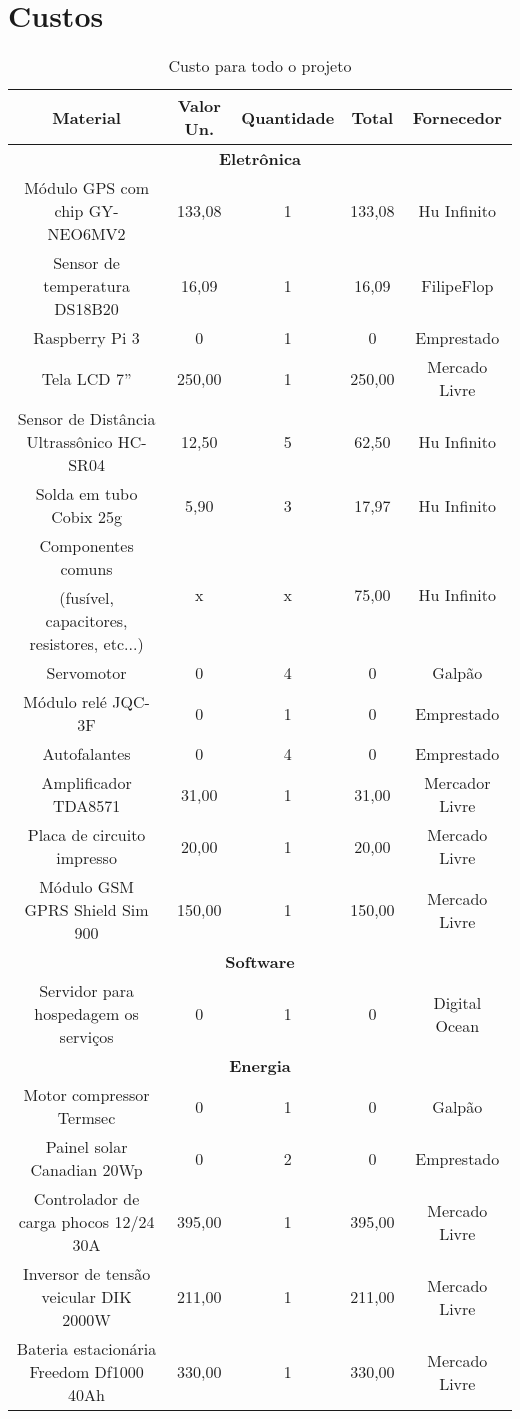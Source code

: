 \chapter{Custos}



\footnotesize  %
\setlength\LTleft{-20pt}            %
\setlength\LTright{\fill}           %
\begin{longtable}{|c|c|c|c|c|}
\caption{Custo para todo o projeto}
\label{tab:custo} 
\endfirsthead
\endhead
\hline
\textbf{Material} & \textbf{Valor Un.} & \textbf{Quantidade} & \textbf{Total} & \textbf{Fornecedor}\tabularnewline
\hline 
\multicolumn{5}{|c|}{\textbf{Eletrônica}}\tabularnewline
\hline 
Módulo GPS com chip GY-NEO6MV2 & 133,08 & 1 & 133,08 & Hu Infinito\tabularnewline
\hline 
Sensor de temperatura DS18B20 & 16,09 & 1 & 16,09 & FilipeFlop\tabularnewline
\hline 
Raspberry Pi 3 & 0 & 1 & 0 & Emprestado\tabularnewline
\hline 
Tela LCD 7'' & 250,00 & 1 & 250,00 & Mercado Livre\tabularnewline
\hline 
Sensor de Distância Ultrassônico HC-SR04 & 12,50 & 5 & 62,50 & Hu Infinito\tabularnewline
\hline 
Solda em tubo Cobix 25g & 5,90 & 3 & 17,97 & Hu Infinito\tabularnewline
\hline 
Componentes comuns  & \multirow{2}{*}{x} & \multirow{2}{*}{x} & \multirow{2}{*}{75,00} & \multirow{2}{*}{Hu Infinito}\tabularnewline
(fusível, capacitores, resistores, etc...) &  &  &  & \tabularnewline
\hline 
Servomotor & 0 & 4 & 0 & Galpão\tabularnewline
\hline 
Módulo relé JQC-3F & 0 & 1 & 0 & Emprestado\tabularnewline
\hline 
Autofalantes & 0 & 4 & 0 & Emprestado\tabularnewline
\hline 
Amplificador TDA8571 & 31,00 & 1 & 31,00 & Mercador Livre\tabularnewline
\hline 
Placa de circuito impresso & 20,00 & 1 & 20,00 & Mercado Livre\tabularnewline
\hline 
Módulo GSM GPRS Shield Sim 900 & 150,00 & 1 & 150,00 & Mercado Livre\tabularnewline
\hline 
\multicolumn{5}{|c|}{\textbf{Software}}\tabularnewline
\hline 
Servidor para hospedagem os serviços & 0 & 1 & 0 & Digital Ocean\tabularnewline
\hline 
\multicolumn{5}{|c|}{\textbf{Energia}}\tabularnewline
\hline 
Motor compressor Termsec & 0 & 1 & 0 & Galpão\tabularnewline
\hline 
Painel solar Canadian 20Wp & 0 & 2 & 0 & Emprestado\tabularnewline
\hline 
Controlador de carga phocos 12/24 30A & 395,00 & 1 & 395,00 & Mercado Livre\tabularnewline
\hline 
Inversor de tensão veicular DIK 2000W & 211,00 & 1 & 211,00 & Mercado Livre\tabularnewline
\hline 
Bateria estacionária Freedom Df1000 40Ah & 330,00 & 1 & 330,00 & Mercado Livre\tabularnewline

\end{longtable}
